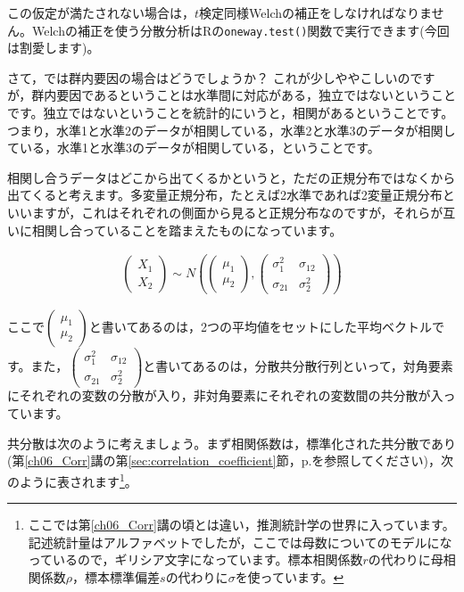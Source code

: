 \documentclass{ltjbook}
\begin{document}
この仮定が満たされない場合は，$t$検定同様Welchの補正をしなければなりません。Welchの補正を使う分散分析はRの\texttt{oneway.test()}関数で実行できます(今回は割愛します)。

さて，では群内要因の場合はどうでしょうか？
これが少しややこしいのですが，群内要因であるということは水準間に対応がある，独立ではないということです。独立ではないということを統計的にいうと，相関があるということです。つまり，水準1と水準2のデータが相関している，水準2と水準3のデータが相関している，水準1と水準3のデータが相関している，ということです。

相関し合うデータはどこから出てくるかというと，ただの正規分布ではなくから出てくると考えます。多変量正規分布，たとえば2水準であれば2変量正規分布といいますが，これはそれぞれの側面から見ると正規分布なのですが，それらが互いに相関し合っていることを踏まえたものになっています。

\begin{align}
\begin{pmatrix}X_1\\ X_2 \end{pmatrix} \sim N \left(
\begin{pmatrix} \mu_1 \\ \mu_2 \end{pmatrix},
\begin{pmatrix} \sigma_1^2 & \sigma_{12} \\ \sigma_{21} & \sigma_2^2 \end{pmatrix}
\right)
\end{align}

ここで$\begin{pmatrix} \mu_1 \\ \mu_2 \end{pmatrix}$と書いてあるのは，2つの平均値をセットにした平均ベクトルです。また，$\begin{pmatrix} \sigma_1^2 & \sigma_{12} \\ \sigma_{21} & \sigma_2^2 \end{pmatrix}$と書いてあるのは，分散共分散行列といって，対角要素にそれぞれの変数の分散が入り，非対角要素にそれぞれの変数間の共分散が入っています。

共分散は次のように考えましょう。まず相関係数は，標準化された共分散であり(第\ref{ch06_Corr}講の第\ref{sec:correlation_coefficient}節，p.\pageref{sec:correlation_coefficient}を参照してください)，次のように表されます\footnote{ここでは第\ref{ch06_Corr}講の頃とは違い，推測統計学の世界に入っています。記述統計量はアルファベットでしたが，ここでは母数についてのモデルになっているので，ギリシア文字になっています。標本相関係数$r$の代わりに母相関係数$\rho$，標本標準偏差$s$の代わりに$\sigma$を使っています。}。
\end{document}
